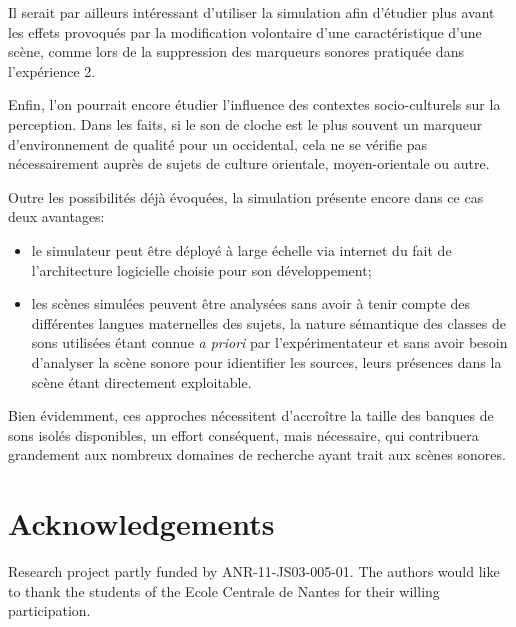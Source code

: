\documentclass[twoside,twocolumn]{article}
\begin{document}
Il serait par ailleurs intéressant d'utiliser la simulation afin d'étudier plus avant les effets provoqués par la modification volontaire d'une caractéristique d'une scène, comme lors de la suppression des marqueurs sonores pratiquée dans l'expérience 2.

Enfin, l'on pourrait encore étudier l'influence des contextes socio-culturels sur la perception. Dans les faits, si le son de cloche est le plus souvent un marqueur d'environnement de qualité pour un occidental, cela ne se vérifie pas nécessairement auprès de sujets de culture orientale, moyen-orientale ou autre.

Outre les possibilités déjà évoquées, la simulation présente encore dans ce cas deux avantages:

\begin{itemize}
\item le simulateur peut être déployé à large échelle via internet du fait de l'architecture logicielle choisie pour son développement;
\item les scènes simulées peuvent être analysées sans avoir à tenir compte des différentes langues maternelles des sujets, la nature sémantique des classes de sons utilisées étant connue \emph{a priori} par l'expérimentateur et sans avoir besoin d'analyser la scène sonore pour idientifier les sources, leurs présences dans la scène étant directement exploitable.
\end{itemize}

Bien évidemment, ces approches nécessitent d'accroître la taille des banques de sons isolés disponibles, un effort conséquent, mais nécessaire, qui contribuera grandement aux nombreux domaines de recherche ayant trait aux scènes sonores.


\section*{\normalsize Acknowledgements}
\setlength{\parindent}{0.7cm}
Research project partly funded by ANR-11-JS03-005-01. The authors would like to thank the students of the Ecole Centrale de Nantes for their willing participation.
\end{document}
